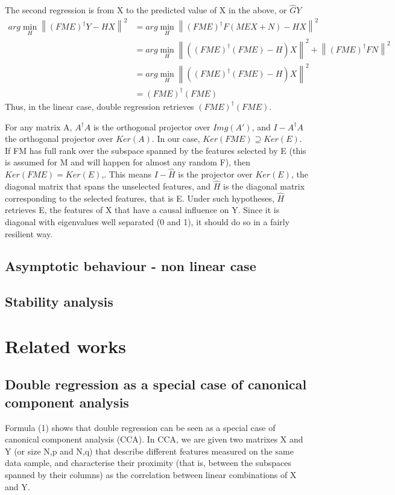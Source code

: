 \documentclass{article}
\begin{document}
The second regression is from X to the predicted value of X in the above, or $\hat G Y$
\begin{equation}
\begin{aligned}
arg \min_H \left \| (FME)^{\dagger}Y - HX \right \|^2 &= arg \min_H \left \| (FME)^{\dagger}F(MEX+N) - HX \right \|^2 \\
&= arg \min_H \left \| ((FME)^{\dagger}(FME)-H)X \right \| ^2 + \left \| (FME)^{\dagger}FN \right \| ^2\\
&= arg \min_H \left \| ((FME)^{\dagger}(FME)-H)X \right \| ^2\\
&=(FME)^{\dagger}(FME)
\end{aligned}
\end{equation}
Thus, in the linear case, double regression retrieves $(FME)^{\dagger}(FME)$.

For any matrix A, $A^\dagger A$ is the orthogonal projector over $Img(A')$, and $I-A^\dagger A$ the orthogonal projector over $Ker(A)$.
%
In our case, $Ker(FME)\supseteq Ker(E)$.
%
If FM has full rank over the subspace spanned by the features selected by E (this is assumed for M and will happen for almost any random F), then $Ker(FME) = Ker(E)$,.
%
This means $I - \hat H$ is the projector over $Ker(E)$, the diagonal matrix that spans the unselected features, and $\hat H$ is the diagonal matrix corresponding to the selected features, that is E.
%
Under such hypotheses, $\hat H$ retrieves E, the features of X that have a causal influence on Y.
%
Since it is diagonal with eigenvalues well separated (0 and 1), it should do so in a fairly resilient way.

\subsection{Asymptotic behaviour - non linear case}

\subsection{Stability analysis}


\section{Related works}
\subsection{Double regression as a special case of canonical component analysis}
Formula (1) shows that double regression can be seen as a special case of canonical component analysis (CCA).
%
In CCA, we are given two matrixes X and Y (or size N,p and N,q) that describe different features measured on the same data sample, and characterise their proximity (that is, between the subspaces spanned by their columns) as the correlation between linear combinations of X and Y.
\end{document}
